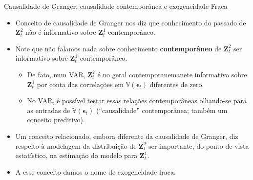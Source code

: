\documentclass[11pt]{beamer}
\begin{document}
\begin{frame}{Causalidade de Granger, causalidade contemporânea e exogeneidade Fraca}
\begin{itemize}
	\item Conceito de causalidade de Granger nos diz que conhecimento do passado de $\boldsymbol{Z}^2_t$ não é informativo sobre $\boldsymbol{Z}^1_t$ contemporâneo.
	\item Note que não falamos nada sobre conhecimento \textbf{contemporâneo} de $\boldsymbol{Z}^2_t$ ser informativo sobre   $\boldsymbol{Z}^1_t$ contemporâneo.
	\begin{itemize}
		\item De fato, num VAR, $\boldsymbol{Z}^2_t$ é no geral contemporanemanete informativo sobre  $\boldsymbol{Z}^1_t$ por conta das correlações em $\mathbb{V}(\boldsymbol{\epsilon}_t)$ diferentes de zero.
		\item No VAR, é possível testar essas relações contemporâneas olhando-se para as entradas de $\mathbb{V}(\boldsymbol{\epsilon}_t)$ ({\color{blue}``causalidade'' contemporânea}; também um conceito preditivo).
	\end{itemize}
	\item Um conceito relacionado, embora diferente da causalidade de Granger, diz respeito à modelagem da distribuição de $\boldsymbol{Z}^2_t$ ser importante, do ponto de vista estatístico, na estimação do modelo para $\boldsymbol{Z}^1_t$.
	\item A esse conceito damos o nome de {\color{blue}exogeneidade fraca}.
\end{itemize}
\end{frame}
\end{document}
